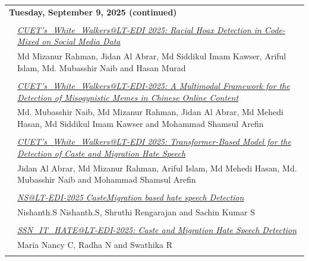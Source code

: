 \documentclass[11pt,oneside]{book}
\begin{document}
          \begin{tabular}{p{24mm}p{124mm}}
    \multicolumn{2}{l}{\bf Tuesday, September 9, 2025 (continued)} \\\\
          
                      & \hyperlink{page.63}{\emph{CUET's\_White\_Walkers@LT-EDI 2025: Racial Hoax Detection in Code-Mixed on Social Media Data}}\\
        & Md Mizanur Rahman\index{Rahman}, Jidan Al Abrar\index{Abrar}, Md Siddikul Imam Kawser\index{Kawser}, Ariful Islam\index{Islam}, Md. Mubasshir Naib\index{Naib} and Hasan Murad\index{Murad}\\\\
                
                      & \hyperlink{page.68}{\emph{CUET's\_White\_Walkers@LT-EDI-2025: A Multimodal Framework for the Detection of Misogynistic Memes in Chinese Online Content}}\\
        & Md. Mubasshir Naib\index{Naib}, Md Mizanur Rahman\index{Rahman}, Jidan Al Abrar\index{Abrar}, Md Mehedi Hasan\index{Hasan}, Md Siddikul Imam Kawser\index{Kawser} and Mohammad Shamsul Arefin\index{Arefin}\\\\
                
                      & \hyperlink{page.75}{\emph{CUET's\_White\_Walkers@LT-EDI 2025: Transformer-Based Model for the Detection of Caste and Migration Hate Speech}}\\
        & Jidan Al Abrar\index{Abrar}, Md Mizanur Rahman\index{Rahman}, Ariful Islam\index{Islam}, Md Mehedi Hasan\index{Hasan}, Md. Mubasshir Naib\index{Naib} and Mohammad Shamsul Arefin\index{Arefin}\\\\
                
                      & \hyperlink{page.80}{\emph{NS@LT-EDI-2025 CasteMigration based hate speech Detection}}\\
        & Nishanth.S Nishanth.S\index{Nishanth.S}, Shruthi Rengarajan\index{Rengarajan} and Sachin Kumar S\index{S}\\\\
                
                      & \hyperlink{page.84}{\emph{SSN\_IT\_HATE@LT-EDI-2025: Caste and Migration Hate Speech Detection}}\\
        & Maria Nancy C\index{C}, Radha N\index{N} and Swathika R\index{R}\\\\
                

\end{tabular}
\end{document}
